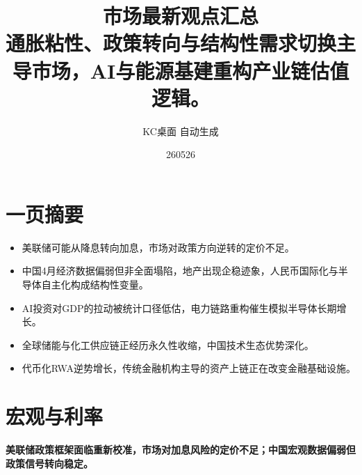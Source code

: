 \documentclass[11pt]{ctexart}
\title{\textbf{市场最新观点汇总}\\[0.4em]{\large 通胀粘性、政策转向与结构性需求切换主导市场，AI与能源基建重构产业链估值逻辑。}}
\author{KC桌面 自动生成}
\date{260526}
\begin{document}
\maketitle
\section*{一页摘要}
\begin{itemize}
  \item 美联储可能从降息转向加息，市场对政策方向逆转的定价不足。
  \item 中国4月经济数据偏弱但非全面塌陷，地产出现企稳迹象，人民币国际化与半导体自主化构成结构性变量。
  \item AI投资对GDP的拉动被统计口径低估，电力链路重构催生模拟半导体长期增长。
  \item 全球储能与化工供应链正经历永久性收缩，中国技术生态优势深化。
  \item 代币化RWA逆势增长，传统金融机构主导的资产上链正在改变金融基础设施。
\end{itemize}
\section{宏观与利率}
\textbf{美联储政策框架面临重新校准，市场对加息风险的定价不足；中国宏观数据偏弱但政策信号转向稳定。}
\end{document}
